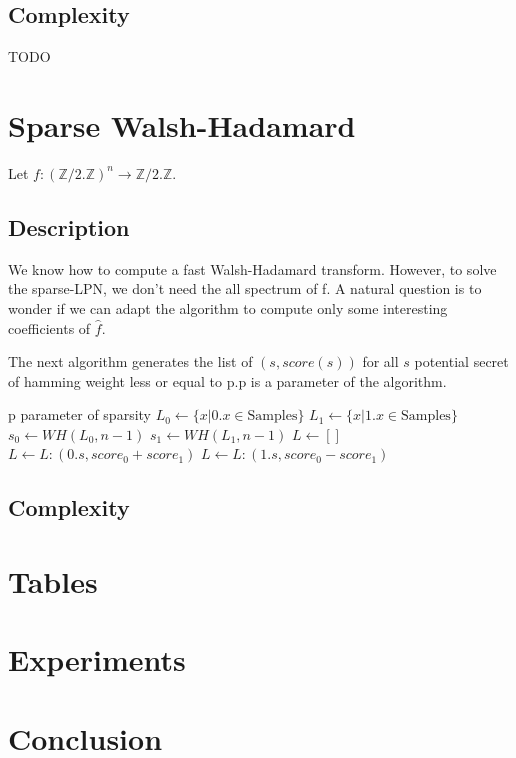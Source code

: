 \documentclass{llncs}		%
\begin{document}
\subsection{Complexity}
TODO
\section{Sparse Walsh-Hadamard}
Let $f:(\mathbb{Z}/2.\mathbb{Z})^n \rightarrow \mathbb{Z}/2.\mathbb{Z}$.

\subsection{Description}
We know how to compute a fast Walsh-Hadamard transform.
However, to solve the sparse-LPN, we don't need the all spectrum of f. 
A natural question is to wonder if we can adapt the algorithm to compute only
some interesting coefficients of $\hat{f}$. 

The next algorithm generates the list of $(s,score(s))$ for all $s$ potential secret of
hamming weight less or equal to p.p is a parameter of the algorithm.
\begin{framed}
\begin{algorithmic}
\State p parameter of sparsity
   \EndIf
\State $L_0 \gets \{x | 0.x \in \text{Samples} \}$
\State $L_1 \gets \{x | 1.x \in \text{Samples} \}$
\State $s_0 \gets WH(L_0,n-1)$ 
\State $s_1 \gets WH(L_1,n-1)$
\State$ L \gets []$
  \State $ L\gets L:(0.s, score_0 + score_1)    $
   $L\gets L: (1.s ,  score_0 - score_1)  $ \EndIf 
\EndFor
{}
\EndFunction
\end{algorithmic}
\end{framed}

\subsection{Complexity}

\section{Tables}

\section{Experiments}

\section{Conclusion}


%
%


%
 
\end{document}
